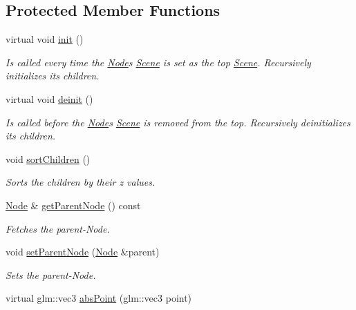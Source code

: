 \subsection*{Protected Member Functions}
\begin{DoxyCompactItemize}
\item 
virtual void \mbox{\hyperlink{classsage_1_1Node_ab87776adae83149e235e37ed469f4e10}{init}} ()
\begin{DoxyCompactList}\small\item\em Is called every time the \mbox{\hyperlink{classsage_1_1Node}{Node}}\textquotesingle{}s \mbox{\hyperlink{classsage_1_1Scene}{Scene}} is set as the top \mbox{\hyperlink{classsage_1_1Scene}{Scene}}. Recursively initializes its children. \end{DoxyCompactList}\item 
virtual void \mbox{\hyperlink{classsage_1_1Node_a726445f512453846694fd36ffa615b22}{deinit}} ()
\begin{DoxyCompactList}\small\item\em Is called before the \mbox{\hyperlink{classsage_1_1Node}{Node}}\textquotesingle{}s \mbox{\hyperlink{classsage_1_1Scene}{Scene}} is removed from the top. Recursively deinitializes its children. \end{DoxyCompactList}\item 
void \mbox{\hyperlink{classsage_1_1Node_aa7d796f1bad7d0e23a4cdd2575b4b9f3}{sort\+Children}} ()
\begin{DoxyCompactList}\small\item\em Sorts the children by their z values. \end{DoxyCompactList}\item 
\mbox{\hyperlink{classsage_1_1Node}{Node}} \& \mbox{\hyperlink{classsage_1_1Node_a250bbfa6108773d1035f4bd61441fdd0}{get\+Parent\+Node}} () const
\begin{DoxyCompactList}\small\item\em Fetches the parent-\/\+Node. \end{DoxyCompactList}\item 
void \mbox{\hyperlink{classsage_1_1Node_abc36311ef7bb8ba6380d403b577fff90}{set\+Parent\+Node}} (\mbox{\hyperlink{classsage_1_1Node}{Node}} \&parent)
\begin{DoxyCompactList}\small\item\em Sets the parent-\/\+Node. \end{DoxyCompactList}\item 
virtual glm\+::vec3 \mbox{\hyperlink{classsage_1_1Node_a708c034b5b9d316265309a3a46811a06}{abs\+Point}} (glm\+::vec3 point)

\end{DoxyCompactItemize}

